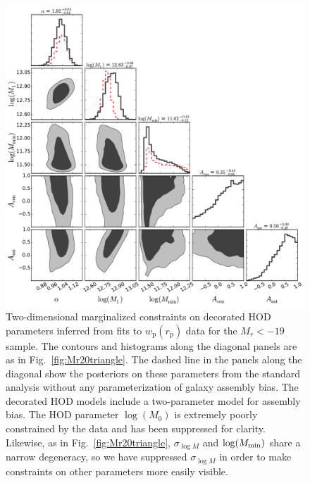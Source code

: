 \documentclass[usenatbib,usegraphicx,letterpaper]{mn2e}
\newcommand{\wprp}{w_{\mathrm{p}}}
\newcommand{\rp}{r_{\mathrm{p}}}
\begin{document}
\begin{figure}
\begin{center}
\includegraphics[width=15.0cm]{Mr19ABTri.pdf}
\caption{ Two-dimensional marginalized constraints on decorated HOD
  parameters inferred from fits to $\wprp(\rp)$ data for the $M_r<-19$
  sample. The contours and histograms along the diagonal panels are as
  in Fig.~\ref{fig:Mr20triangle}. The dashed line in the panels along the diagonal
  show the posteriors on these parameters from the standard analysis without
  any parameterization of galaxy assembly bias. The decorated HOD models include a
  two-parameter model for assembly bias. The HOD parameter $\log
  (M_0)$ is extremely poorly constrained by the data and has been
  suppressed for clarity. Likewise, as in Fig.~\ref{fig:Mr20triangle},
  $\sigma_{\log M}$ and $\log (M_{\rm min})$ share a narrow
  degeneracy, so we have suppressed $\sigma_{\log M}$ in order to make
  constraints on other parameters more easily visible.  }
\label{fig:Mr19ABtriangle}
\end{center}
\end{figure}
\end{document}
